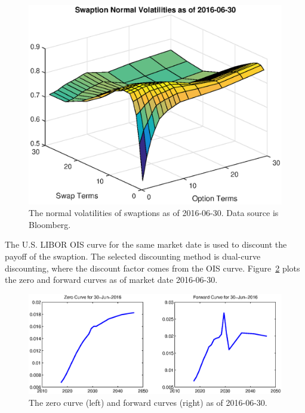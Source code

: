 \begin{center}
  \begin{figure}
  \centering
      \includegraphics[scale=0.6]{swaption_normal_vol.eps}
      \caption{The normal volatilities of swaptions as of 2016-06-30. Data source is Bloomberg.}\label{fig::swaption_normal_vol}
  \end{figure}
\end{center}

The U.S. LIBOR OIS curve for the same market date is used to discount the payoff of the swaption. The selected discounting method is dual-curve discounting, where the discount factor comes from the OIS curve. Figure~\ref{fig::curves} plots the zero and forward curves as of market date 2016-06-30.

\begin{center}
  \begin{figure}
  \centering
      \includegraphics[scale=0.6]{zero_forward_curves.eps}
      \caption{The zero curve (left) and forward curves (right) as of 2016-06-30.}\label{fig::curves}
  \end{figure}
\end{center}

